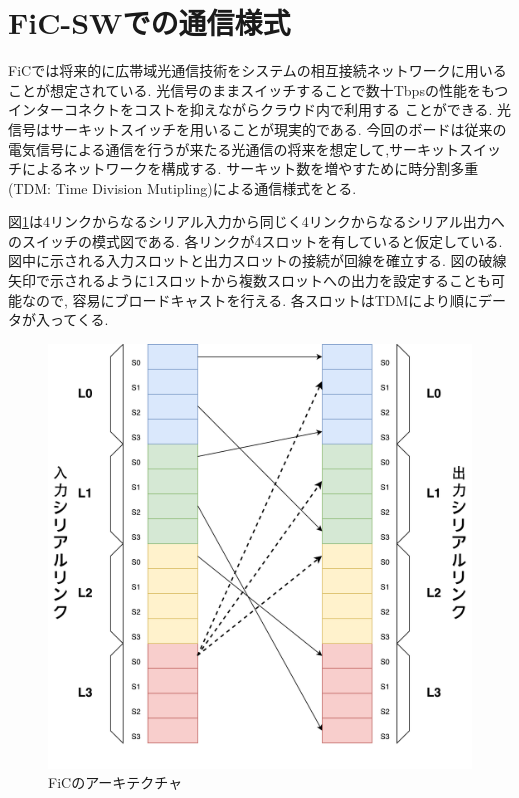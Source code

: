{  \section{FiC-SWでの通信様式}
  \label{sec:ficsw_communication}
  FiCでは将来的に広帯域光通信技術をシステムの相互接続ネットワークに用いることが想定されている.
  光信号のままスイッチすることで数十Tbpsの性能をもつインターコネクトをコストを抑えながらクラウド内で利用する
  ことができる.
  光信号はサーキットスイッチを用いることが現実的である.
  今回のボードは従来の電気信号による通信を行うが来たる光通信の将来を想定して,サーキットスイッチによるネットワークを構成する.
  サーキット数を増やすために時分割多重(TDM: Time Division Mutipling)による通信様式をとる.
  
  図\ref{fig:arch-sw}は4リンクからなるシリアル入力から同じく4リンクからなるシリアル出力へのスイッチの模式図である.
  各リンクが4スロットを有していると仮定している.図中に示される入力スロットと出力スロットの接続が回線を確立する.
  図の破線矢印で示されるように1スロットから複数スロットへの出力を設定することも可能なので,
  容易にブロードキャストを行える.
  各スロットはTDMにより順にデータが入ってくる.
  
   \begin{figure}[h]
     \centering
     \includegraphics[width=12cm]{./chap3/fig/arch_sw.pdf}
     \caption{FiCのアーキテクチャ}
     \label{fig:arch-sw}
   \end{figure}
}
